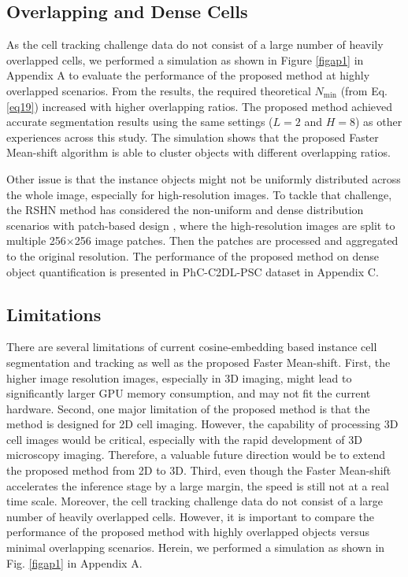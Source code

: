 \documentclass[journal,twoside,web]{ieeecolor}
\begin{document}
\subsection{Overlapping and Dense Cells}
As the cell tracking challenge data do not consist of a large number of heavily overlapped cells, we performed a simulation as shown in Figure \ref{figap1} in Appendix A to evaluate the performance of the proposed method at highly overlapped scenarios. From the results, the required theoretical $N_{\min }$ (from Eq. \eqref{eq19}) increased with higher overlapping ratios. The proposed method achieved accurate segmentation results using the same settings ($L=2$ and $H=8$) as other experiences across this study. The simulation shows that the proposed Faster Mean-shift algorithm is able to cluster objects with different overlapping ratios. 

Other issue is that the instance objects might not be uniformly distributed across the whole image, especially for high-resolution images. To tackle that challenge, the RSHN method has considered the non-uniform and dense distribution scenarios with patch-based design \cite{b15}, where the high-resolution images are split to multiple 256×256 image patches. Then the patches are processed and aggregated to the original resolution. The performance of the proposed method on dense object quantification is presented in PhC-C2DL-PSC dataset in Appendix C.

\subsection{Limitations}
There are several limitations of current cosine-embedding based instance cell segmentation and tracking as well as the proposed Faster Mean-shift. First, the higher image resolution images, especially in 3D imaging, might lead to significantly larger GPU memory consumption, and may not fit the current hardware. Second, one major limitation of the proposed method is that the method is designed for 2D cell imaging. However, the capability of processing 3D cell images would be critical, especially with the rapid development of 3D microscopy imaging. Therefore, a valuable future direction would be to extend the proposed method from 2D to 3D.  Third, even though the Faster Mean-shift accelerates the inference stage by a large margin, the speed is still not at a real time scale. Moreover, the cell tracking challenge data do not consist of a large number of heavily overlapped cells. However, it is important to compare the performance of the proposed method with highly overlapped objects versus minimal overlapping scenarios. Herein, we performed a simulation as shown in Fig. \ref{figap1} in Appendix A. 
\end{document}
